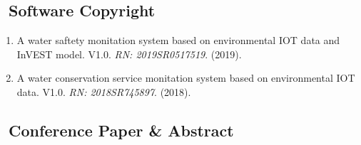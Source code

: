 \subsection*{\texorpdfstring{\faBook\ Software Copyright}{Software Copyright}}
\begin{enumerate}
\item
    A water saftety monitation system based on environmental IOT data and InVEST model. V1.0.
    \textit{RN: 2019SR0517519}. (2019).
\item
    A water conservation service monitation system based on environmental IOT data. V1.0.
    \textit{RN: 2018SR745897}. (2018).
\end{enumerate}

\subsection*{\texorpdfstring{\faBook\ Conference Paper \& Abstract}{Conference Paper \& Abstract}}
